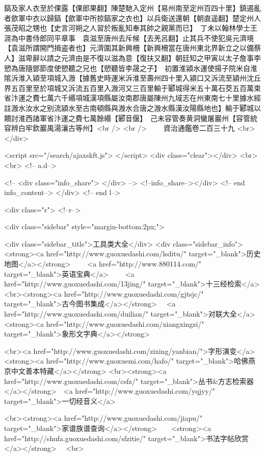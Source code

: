 鎬及家人衣至於倮露【倮郎果翻】陳楚馳入定州【易州南至定州百四十里】鎮遏亂者歛軍中衣以歸鎬【歛軍中所掠鎬家之衣也】以兵衛送還朝【朝直遥翻】楚定州人張茂昭之甥也【史言河朔之人習於叛亂知奉其帥之親黨而已】　丁未以翰林學士王涯為中書侍郎同平章事　袁滋至唐州去斥候【去羌呂翻】止其兵不使犯吳元濟境【袁滋所謂開門揖盗者也】元濟圍其新興柵【新興柵當在唐州東北界新立之以備蔡人】滋卑辭以請之元濟由是不復以滋為意【復扶又翻】朝廷知之甲寅以太子詹事李愬為唐隨鄧節度使愬聽之兄也【愬聽皆李晟之子】　初置淮潁水運使揚子院米自淮隂泝淮入潁至項城入溵【據舊史時運米泝淮至壽州四十里入潁口又泝流至潁州沈丘界五百里至於項城又泝流五百里入溵河又三百里輸于郾城得米五十萬石茭五百萬束省汴運之費七萬六千緡項城漢項縣屬汝南郡唐屬陳州九域志在州東南七十里據水經註溵水汝水之别流潁水至古南頓縣與溵水合唐之溵水縣漢汝陽縣地也】輸于郾城以饋討淮西諸軍省汴運之費七萬餘緡【郾音偃】　己未容管奏黄洞蠻屠巖州【容管統容辨白牢欽巖禺湯瀼古等州】<br />
<br />
　　資治通鑑卷二百三十九  <br>
   </div> 

<script src="/search/ajaxskft.js"> </script>
 <div class="clear"></div>
<br>
<br>
 <!-- a.d-->

 <!--
<div class="info_share">
</div> 
-->
 <!--info_share--></div>   <!-- end info_content-->
  </div> <!-- end l-->

<div class="r">   <!--r-->



<div class="sidebar"  style="margin-bottom:2px;">

 
<div class="sidebar_title">工具类大全</div>
<div class="sidebar_info">
<strong><a href="http://www.guoxuedashi.com/lsditu/" target="_blank">历史地图</a></strong>　　
<a href="http://www.880114.com/" target="_blank">英语宝典</a>　　
<a href="http://www.guoxuedashi.com/13jing/" target="_blank">十三经检索</a>　
<br><strong><a href="http://www.guoxuedashi.com/gjtsjc/" target="_blank">古今图书集成</a></strong>　
<a href="http://www.guoxuedashi.com/duilian/" target="_blank">对联大全</a>　<strong><a href="http://www.guoxuedashi.com/xiangxingzi/" target="_blank">象形文字典</a></strong>　

<br><a href="http://www.guoxuedashi.com/zixing/yanbian/">字形演变</a>　　<strong><a href="http://www.guoxuemi.com/hafo/" target="_blank">哈佛燕京中文善本特藏</a></strong>
<br><strong><a href="http://www.guoxuedashi.com/csfz/" target="_blank">丛书&方志检索器</a></strong>　<a href="http://www.guoxuedashi.com/yqjyy/" target="_blank">一切经音义</a>　　

<br><strong><a href="http://www.guoxuedashi.com/jiapu/" target="_blank">家谱族谱查询</a></strong>　　<strong><a href="http://shufa.guoxuedashi.com/sfzitie/" target="_blank">书法字帖欣赏</a></strong>　
<br>

